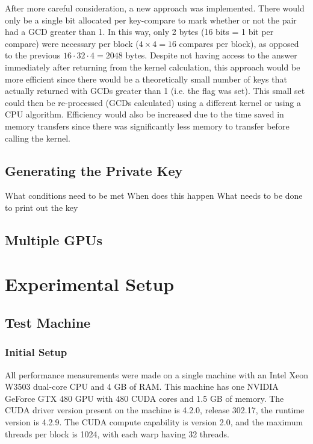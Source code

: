 \documentclass[smallextended]{svjour3}       %
\begin{document}
After more careful consideration, a new approach was implemented. There would 
only be a single bit allocated per key-compare to mark whether or not the pair 
had a GCD greater than 1. In this way, only 2 bytes (16 bits = 1 bit per 
compare) were necessary per block ($4\times4 = 16$ compares per block), as 
opposed to the previous $16 \cdot 32 \cdot 4 = 2048$ bytes. Despite not having access 
to the answer immediately after returning from the kernel calculation, this 
approach would be more efficient since there would be a theoretically small 
number of keys that actually returned with GCDs greater than 1 (i.e. the flag 
was set). This small set could then be re-processed (GCDs calculated) using a 
different kernel or using a CPU algorithm. Efficiency would also be increased 
due to the time saved in memory transfers since there was significantly less 
memory to transfer before calling the kernel.

\subsection{Generating the Private Key}
\label{subsec:private}
What conditions need to be met
When does this happen
What needs to be done to print out the key

\subsection{Multiple GPUs}
\label{subsec:multiGPU}


\section{Experimental Setup}
\label{sec:expsetup}

\subsection{Test Machine}
\label{subsec:testmachine}

\subsubsection{Initial Setup}
\label{subsubsec:initsetup}
All performance measurements were made on a single machine with an Intel Xeon 
W3503 dual-core CPU and 4 GB of RAM. This machine has one NVIDIA GeForce
GTX 480 GPU with 480 CUDA cores and 1.5 GB of memory. The CUDA driver 
version present on the machine is 4.2.0, release 302.17, the runtime version is
4.2.9. The CUDA compute capability is version 2.0, and the maximum threads per 
block is 1024, with each warp having 32 threads.
\end{document}
